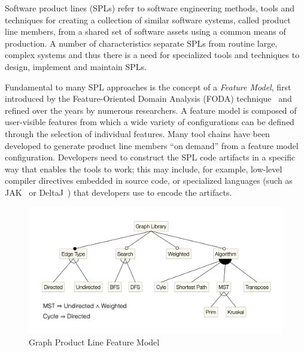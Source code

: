 
Software product lines (SPLs) refer to software engineering methods,
tools and techniques for creating a collection of similar software
systems, called product line members, from a shared set of software
assets using a common means of production. A number of characteristics
separate SPLs from routine large, complex systems and thus there is a need for specialized tools and techniques to design, implement and maintain SPLs. 

Fundamental to many SPL approaches is the concept of a \textit{Feature
Model}, first introduced by the Feature-Oriented Domain Analysis (FODA)
technique~\cite{Kang1990} and refined over the years by numerous
researchers. A feature model is composed of user-visible features from
which a wide variety of configurations can be defined through the
selection of individual features. Many tool chains have been developed
to generate product line members ``on demand'' from a feature model
configuration. Developers need to construct the SPL code artifacts in a
specific way that enables the tools to work; this may include, for
example, low-level compiler directives embedded in source code, or
specialized languages (such as JAK~\cite{Batory2004FeatureorientedPA} or
DeltaJ~\cite{Schaefer:2010:DPS:1885639.1885647}) that developers use to
encode the artifacts.

\begin{figure}
    \includegraphics[scale=0.4]{gpl2.png}
    \caption{Graph Product Line Feature Model}
    \label{fig:feature-model}
\end{figure}

